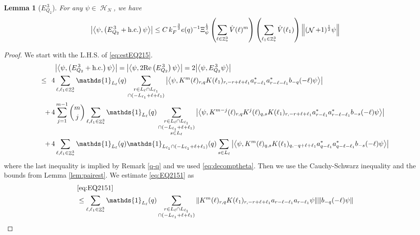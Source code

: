 \documentclass[sn-mathphys, Numbered ,a4paper]{sn-jnl}%
\DeclareMathOperator{\Z}{\mathbb{Z}}
\DeclareMathOperator{\HH}{\mathcal{H}}
\DeclareMathOperator{\NN}{\mathcal{N}}
\newcommand{\half}{\frac{1}{2}}
\newcommand{\eva}[1]{\left\langle #1 \right\rangle}
\theoremstyle{plain}
\newtheorem{lemma}[theorem]{Lemma}
\theoremstyle{definition}
\theoremstyle{remark}
\theoremstyle{plain}
\theoremstyle{definition}
\theoremstyle{remark}
\begin{document}
\begin{lemma}[$E_{Q_2}^{\,3}$]\label{lem:EQ215}
For any $\psi \in \HH_N$, we have
	\begin{align}
    	\abs{\eva{\psi,\left(E^{\,3}_{Q_2}+\mathrm{h.c.}\right) \psi }}
    	\leq C\, k_{F}^{-\frac{3}{2}} e(q)^{-1} \Xi_{\psi}^{\half} \left(\sum\limits_{\ell\in \Z^3_*} \hat{V}(\ell)^m \right) \left(\sum\limits_{\ell_1\in \Z^3_*} \hat{V}(\ell_1) \right) \norm{(\NN+1)^\half \psi } \label{eq:estEQ215}
    \end{align}
\end{lemma}
\begin{proof}
We start with the L.H.S. of \eqref{eq:estEQ215}.
\begin{align}
    &\abs{\eva{\psi,\left(E^{\,3}_{Q_2}+\mathrm{h.c.}\right) \psi }} = \abs{\eva{\psi,2\mathrm{Re}\left(E^{\,3}_{Q_2}\right) \psi }} = 2\abs{\eva{\psi, E^{\,3}_{Q_2} \psi }}\nonumber\\
    \leq\,\;4& \sum\limits_{\ell, \ell_1\in \Z^3_*} \mathds{1}_{L_{\ell}}(q) \sum\limits_{\substack{r\in L_{\ell} \cap L_{\ell_1} \\ \cap (-L_{\ell_1}+\ell+\ell_1)}} \abs{\eva{\psi,  K^m(\ell)_{r,q} K(\ell_1)_{r,-r+\ell+\ell_1}  a^*_{r-\ell_1}a^*_{r-\ell-\ell_1}b_{-q}(-\ell)\psi }} \label{eq:EQ2151}\\
    +\,4& \sum\limits_{j=1}^{m-1} {{m}\choose j} \sum\limits_{\ell, \ell_1\in \Z^3_*}\mathds{1}_{L_{\ell}}(q) \sum\limits_{\substack{r\in L_{\ell} \cap L_{\ell_1}\\ \cap (-L_{\ell_1}+\ell+\ell_1)\\ s \in L_{\ell}}}  \abs{\eva{\psi, K^{m-j}(\ell)_{r,q} K^j(\ell)_{q,s} K(\ell_1)_{r,-r+\ell+\ell_1}  a^*_{r-\ell_1}a^*_{r-\ell-\ell_1}b_{-s}(-\ell) \psi }} \label{eq:EQ2152}\\
    +\,4&\sum\limits_{\ell, \ell_1\in \Z^3_*} \mathds{1}_{L_{\ell}}(q) \mathds{1}_{L_{\ell_1}\cap (-L_{\ell_1}+\ell+\ell_1)}(q) \sum\limits_{ s \in L_{\ell}} \abs{\eva{\psi, K^m(\ell)_{q,s} K(\ell_1)_{q,-q+\ell+\ell_1}  a^*_{q-\ell_1} a^*_{q-\ell-\ell_1} b_{-s}(-\ell) \psi }} \label{eq:EQ2153}
\end{align}
where the last inequality is implied by Remark \ref{q-q} and we used \eqref{eq:decomptheta}.
Then we use the Cauchy-Schwarz inequality and the bounds from Lemma \ref{lem:pairest}.
We estimate \eqref{eq:EQ2151} as
\begin{align}
    &\eqref{eq:EQ2151}\nonumber\\
	&\leq \sum\limits_{\ell, \ell_1\in \Z^3_*} \mathds{1}_{L_{\ell}}(q) \sum\limits_{\substack{r\in L_{\ell} \cap L_{\ell_1} \\ \cap (-L_{\ell_1}+\ell+\ell_1)}} \norm{K^m(\ell)_{r,q} K(\ell_1)_{r,-r+\ell+\ell_1} a_{r-\ell-\ell_1} a_{r-\ell_1} \psi}\norm{  b_{-q}(-\ell) \psi}\nonumber\\

\end{align}
\end{proof}
\end{document}
